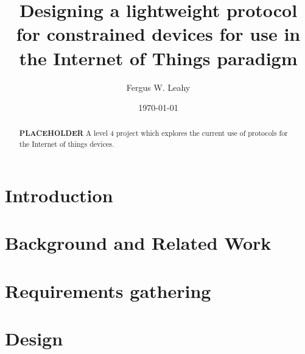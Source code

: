 \documentclass{l4proj}
\begin{document}
\title{Designing a lightweight protocol for constrained devices for use in the Internet of Things paradigm}
\author{Fergus W. Leahy}
\date{\today}
\maketitle

\begin{abstract}
\textbf{PLACEHOLDER}
A level 4 project which explores the current use of protocols for the Internet of things devices.
\end{abstract}

\educationalconsent
%
%
\tableofcontents

\chapter{Introduction}

\chapter{Background and Related Work} %
\label{cha:background}




\chapter{Requirements gathering} %
\label{cha:requirments_gathering}






\chapter{Design} %
\label{cha:design}

\end{document}
